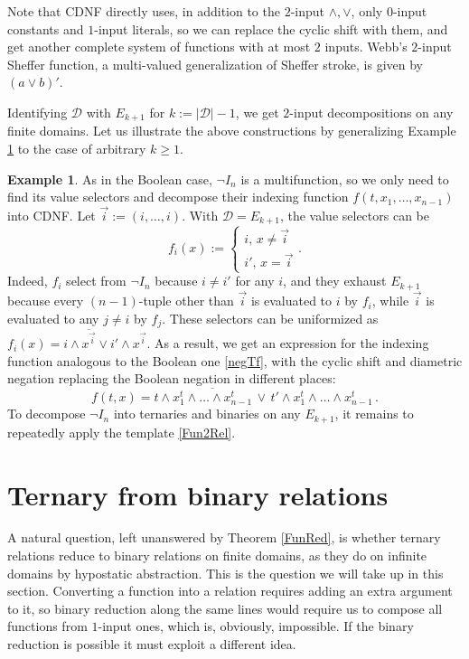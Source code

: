 \documentclass[11pt]{article}
\theoremstyle{plain}
\theoremstyle{definition}
\newtheorem{example}{Example}
\def\D{\mathcal{D}}
\begin{document}
Note that CDNF directly uses, in addition to the $2$-input $\land,\lor$, only $0$-input constants and $1$-input literals, so we can replace the cyclic shift with them, and get another complete system of functions with at most $2$ inputs. Webb's $2$-input Sheffer function, a multi-valued generalization of Sheffer stroke, is given by $(a\lor b)'$.

Identifying $\D$ with $E_{k+1}$ for $k:=|\D|-1$, we get $2$-input decompositions on any finite domains. Let us illustrate the above constructions by generalizing Example \ref{NegIred} to the case of arbitrary $k\geq1$.

\begin{example}\label{NegIred} As in the Boolean case, $\neg I_n$ is a multifunction, so we only need to find its value selectors and decompose their indexing function $f(t,x_1,\dots,x_{n-1})$ into CDNF. Let $\vec{i}:=(i,\dots,i)$. With $\D=E_{k+1}$, the value selectors can be
$$
f_i(x):=\begin{cases}i,\,x\neq\vec{i}\\
i',\,x=\vec{i}\end{cases}\!\!\!.
$$
Indeed, $f_i$ select from $\neg I_n$ because $i\neq i'$ for any $i$, and they exhaust $E_{k+1}$ because every $(n-1)$-tuple other than $\vec{i}$ is evaluated to $i$ by $f_i$, while $\vec{i}$ is evaluated to any $j\neq i$ by $f_j$. These selectors can be uniformized as $f_i(x)=i\land\overline{x^{\vec{i}}}\lor i'\land x^{\vec{i}}$. As a result, we get an expression for the indexing function analogous to the Boolean one \eqref{negTf}, with the cyclic shift and diametric negation replacing the Boolean negation in different places:
$$
f(t,x)=t\land \overline{x_1^{t}\land\dots\land x_{n-1}^{t}}\,\lor\,t'\land x_1^{t}\land\dots\land x_{n-1}^{t}\,.
$$
To decompose $\neg I_n$ into ternaries and binaries  on any $E_{k+1}$, it remains to repeatedly apply the template \eqref{Fun2Rel}.
\end{example}


\section{Ternary from binary relations}\label{RedBin}

A natural question, left unanswered by Theorem \ref{FunRed}, is whether ternary relations reduce to binary relations on finite domains, as they do on infinite domains by hypostatic abstraction. This is the question we will take up in this section. Converting a function into a relation requires adding an extra argument to it, so binary reduction along the same lines would require us to compose all functions from $1$-input ones, which is, obviously, impossible. If the binary reduction is possible it must exploit a different idea.
\end{document}
